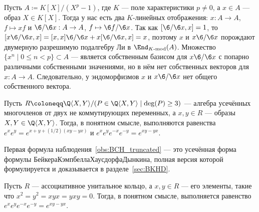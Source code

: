 \documentclass[
	extrafontsizes,
	11pt,
	hyphens,
]{memoir}
\begin{document}
\begin{observation}
Пусть \(A \coloneqq K[X]/(X^p - 1)\), где \(K\) --- поле характеристики \(p \neq 0\), а \(x \in A\) --- образ \(X \in K[X]\).
Тогда у нас есть два \(K\)-ли\-ней\-ных отображения:
\(x : A \to A\), \(f \mapsto xf\) и
\(\6 / \6 x : A \to A\), \(f \mapsto \6 f / \6 x\).
Так как \([\6 / \6 x, x] = 1\), то
\([x \6 / \6 x, x] = [x,x] \6 / \6 x + x [\6 / \6 x, x] = x\),
поэтому \(x\) и \(x \6 / \6 x\) порождают двумерную разрешимую подалгебру Ли в \(\End_{K\textnormal{-}\mathrm{mod}}(A)\).
Множество \(\{x^n \mid 0 \leq n < p\} \subset A\) --- является собственным базисом для \(x \6 / \6 x\) с попарно различными собственными значениями, но в нём нет собственных векторов для \(x : A \to A\).
Следовательно, у эндоморфизмов \(x\) и \(x \6 / \6 x\) нет общего собственного вектора.
\end{observation}

\begin{observation} \label{obs:BCH_truncated}
Пусть \(R \coloneqq \Q\langle X, Y \rangle / (P \in \Q\langle X, Y \rangle \mid \deg(P) \geq 3)\) --- алгебра усечённых многочленов от двух не коммутирующих переменных, а \(x, y \in R\) --- образы \(X, Y \in \Q\langle X, Y \rangle\).
Тогда, в понятном смысле, выполняются равенства \(e^x e^y = e^{x + y + (1/2)(xy - yx)}\) и \(e^x e^y e^{-x} e^{-y} = e^{xy - yx}\).
\end{observation}

\begin{remark}
Первая формула наблюдения~\ref{obs:BCH_truncated} --- это усечённая форма формулы Бейкера\namedash{}Кэмпбелла\namedash{}Хаусдорфа\namedash{}Дынкина, полная версия которой формулируется и доказывается в разделе~\ref{sec:BKHD}.
\end{remark}


\begin{corollary}
Пусть \(R\) --- ассоциативное унитальное кольцо, а \(x, y \in R\) --- его элементы, такие что \(x^2 = y^2 = xyx = yxy = 0\). Тогда, в понятном смысле, выполняется равенство \(e^x e^y e^{-x} e^{-y} = e^{xy - yx}\).
\end{corollary}
\end{document}
